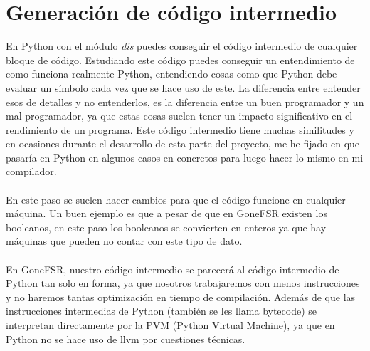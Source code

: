 \section{Generación de código intermedio}
En Python con el módulo \textit{dis} puedes conseguir el código intermedio de cualquier bloque de código. Estudiando este código puedes conseguir un entendimiento de como funciona realmente Python, entendiendo cosas como que Python debe evaluar un símbolo cada vez que se hace uso de este. La diferencia entre entender esos de detalles y no entenderlos, es la diferencia entre un buen programador y un mal programador, ya que estas cosas suelen tener un impacto significativo en el rendimiento de un programa. Este código intermedio tiene muchas similitudes y en ocasiones durante el desarrollo de esta parte del proyecto, me he fijado en que pasaría en Python en algunos casos en concretos para luego hacer lo mismo en mi compilador. \\\\
\noindent En este paso se suelen hacer cambios para que el código funcione en cualquier máquina. Un buen ejemplo es que a pesar de que en GoneFSR existen los booleanos, en este paso los booleanos se convierten en enteros ya que hay máquinas que pueden no contar con este tipo de dato. \\\\
En GoneFSR, nuestro código intermedio se parecerá al código intermedio de Python tan solo en forma, ya que nosotros trabajaremos con menos instrucciones y no haremos tantas optimización en tiempo de compilación. Además de que las instrucciones intermedias de Python (también se les llama bytecode) se interpretan directamente por la PVM (Python Virtual Machine), ya que en Python no se hace uso de llvm por cuestiones técnicas. 
